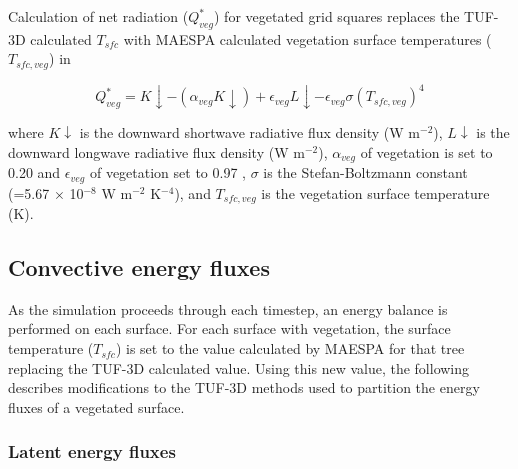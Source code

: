 \documentclass[final,3p,times,authoryear]{elsarticle}
\begin{document}
Calculation of net radiation ($Q^{*}_{veg}$) for vegetated grid squares replaces the TUF-3D calculated $T_{sfc}$ with MAESPA calculated vegetation surface temperatures ($T_{sfc,veg}$) in 

\begin{equation}\label{eq:rnet}
Q^{*}_{veg} = K\downarrow - (\alpha _{veg} K\downarrow) + \epsilon _{veg} L\downarrow - \epsilon _{veg} \sigma  (T_{sfc,veg}) ^{4} 
\end{equation}

where $K\downarrow$ is the downward shortwave radiative flux density (W m$^{-2}$), $L\downarrow$ is the downward longwave radiative flux density (W m$^{-2}$), $\alpha _{veg}$ of vegetation is set to 0.20 and $\epsilon _{veg}$ of vegetation set to 0.97 \citep[p. 12]{Oke1987z}, $\sigma$ is the Stefan-Boltzmann constant (=5.67 $\times$ 10$^{-8}$ W m$^{-2}$ K$^{-4}$), and $T_{sfc,veg}$ is the vegetation surface temperature (K).




\subsection{Convective energy fluxes}

As the simulation proceeds through each timestep, an energy balance is performed on each surface. For each surface with vegetation, the surface temperature ($T_{sfc}$) is set to the value calculated by MAESPA for that tree replacing the TUF-3D calculated value. Using this new value, the following describes modifications to the TUF-3D methods used to partition the energy fluxes of a vegetated surface.

\subsubsection{Latent energy fluxes}
\label{sec:calcleaftemp}
\label{sec:waterbalance}
\end{document}
